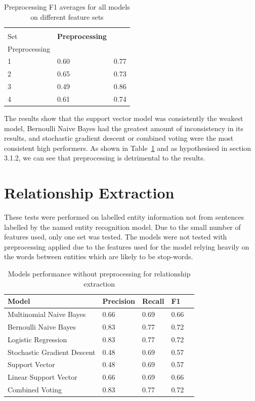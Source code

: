 \documentclass[11pt,oneside]{book}
\begin{document}
\begin{longtable}[c]{|l|l|l|}
\caption{Preprocessing F1 averages for all models on different feature sets}
\label{tab:ner_preprocessing}\\
\hline
\textbf{\begin{tabular}[c]{@{}l@{}}Feature \\ Set\end{tabular}} & \textbf{Preprocessing} & \textbf{\begin{tabular}[c]{@{}l@{}}No\\ Preprocessing\end{tabular}} \\ \hline
\endfirsthead
%
\endhead
%
1 & 0.60 & 0.77 \\ \hline
2 & 0.65 & 0.73 \\ \hline
3 & 0.49 & 0.86 \\ \hline
4 & 0.61 & 0.74 \\ \hline
\end{longtable}

The results show that the support vector model was consistently the weakest model, Bernoulli Naive Bayes had the greatest amount of inconsistency in its results, and stochastic gradient descent or combined voting were the most consistent high performers. As shown in Table~\ref{tab:ner_preprocessing} and as hypothesised in section 3.1.2, we can see that preprocessing is detrimental to the results.

\section{Relationship Extraction}
These tests were performed on labelled entity information not from sentences labelled by the named entity recognition model. Due to the small number of features used, only one set was tested. The models were not tested with preprocessing applied due to the features used for the model relying heavily on the words between entities which are likely to be stop-words. 

\begin{longtable}{|l|l|l|l|l|}
\caption{Models performance without preprocessing for relationship extraction}
\label{tab:re_feature_set_1}\\
\hline
\textbf{Model}          & \multicolumn{1}{c|}{\textbf{Precision}} & \multicolumn{1}{c|}{\textbf{Recall}} & \textbf{F1} \\ \hline
\endfirsthead
%
\endhead
%
Multinomial Naive Bayes &  0.66  & 0.69  & 0.66  \\ \hline
Bernoulli Naive Bayes       & 0.83 & 0.77 & 0.72  \\ \hline
Logistic Regression         & 0.83 & 0.77 & 0.72  \\ \hline
Stochastic Gradient Descent & 0.48 & 0.69 & 0.57  \\ \hline
Support Vector              & 0.48 & 0.69 & 0.57  \\ \hline
Linear Support Vector       & 0.66 & 0.69 & 0.66  \\ \hline
Combined Voting             & 0.83 & 0.77 & 0.72  \\ \hline
\end{longtable}
\end{document}
